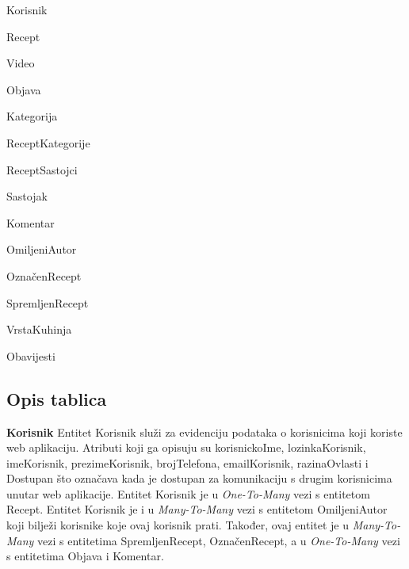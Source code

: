 		\begin{packed_item}
			
			\item Korisnik
			\item Recept
			\item Video
			\item Objava
			\item Kategorija
			\item ReceptKategorije
			\item ReceptSastojci
			\item Sastojak
			\item Komentar
			\item OmiljeniAutor
			\item OznačenRecept
			\item SpremljenRecept
			\item VrstaKuhinja
			\item Obavijesti
			
		\end{packed_item}
		
		\eject
		
		\subsection{Opis tablica}
		
		
		\textnormal{\textbf{Korisnik}		Entitet Korisnik služi za evidenciju podataka o korisnicima koji koriste web aplikaciju. Atributi koji ga opisuju su korisnickoIme, lozinkaKorisnik, imeKorisnik, prezimeKorisnik, brojTelefona, emailKorisnik, razinaOvlasti i Dostupan što označava kada je dostupan za komunikaciju s drugim korisnicima unutar web aplikacije. Entitet Korisnik je u \textit{One-To-Many} vezi s entitetom Recept. Entitet Korisnik je i u \textit{Many-To-Many} vezi s entitetom OmiljeniAutor koji bilježi korisnike koje ovaj korisnik prati. Također, ovaj entitet je u \textit{Many-To-Many} vezi s entitetima SpremljenRecept, OznačenRecept, a u \textit{One-To-Many} vezi s entitetima Objava i Komentar.}
		
